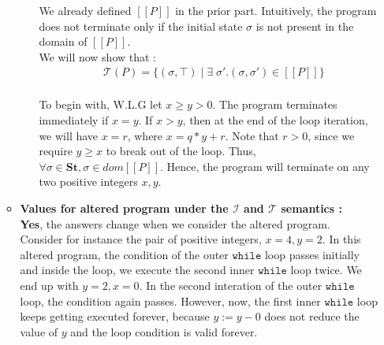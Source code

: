 \documentclass{article}
\newcommand{\whilesym}{\mathtt{while}}
\begin{document}
\begin{enumerate}
\begin{itemize}
\begin{itemize}
	We already defined $[[ P ]]$ in the prior part.
	Intuitively, the program does not terminate only if the initial state
	$\sigma$ is not present in the domain of $[[P]]$.\\
	
	We will now show that :
	\begin{align*}	
	& \mathcal{T}(P) = \{ ( \sigma, \top ) \; | \; \exists \; \sigma'.(\sigma,
	\sigma') \in [[ P ]] \} \\
	\end{align*}
	
	To begin with, W.L.G let $ x \geq y > 0$. The program terminates
	immediately if $x = y$. If $x > y$, then at the end of the loop iteration,
	we will have $x = r$, where $x = q * y + r$.
	Note that $r > 0$, since we require $y \geq x$ to break out of the loop.
	Thus, $\forall \sigma \in \textbf{St}, \sigma \in dom[[ P ]]$. Hence,
	the program will terminate on any two positive integers $x, y$.\\

	\end{itemize}	
	
	

\item \textbf{Values for altered program under the $\mathcal{I}$ and
$\mathcal{T}$ semantics :}\\

	\textbf{Yes}, the answers change when we consider the altered program.\\
	
	Consider for instance the pair of positive integers, $x = 4, y = 2$. 
	In this altered program, the condition of the outer $\whilesym$ loop passes
	initially and inside the loop, we execute the second inner $\whilesym$ loop twice.
	We end up with $y = 2, x = 0$. In the second interation of the outer
	$\whilesym$ loop, the condition again passes. However, now, the
	first inner $\whilesym$ loop keeps getting executed forever, because
	$y := y - 0$ does not reduce the value of $y$ and the loop condition
	is valid forever.\\

\begin{itemize}
	  

\end{itemize}
\end{itemize}
\end{enumerate}
\end{document}
